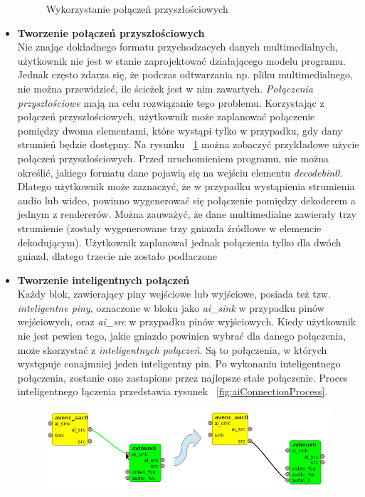 \documentclass[12pt]{article}
\begin{document}
\begin{itemize}
\begin{figure}[H]
  \caption{Wykorzystanie połączeń przyszłościowych}
  \label{fig:futureConnections}
\end{figure}
\item \textbf{Tworzenie połączeń przyszłościowych} \\
Nie znając dokładnego formatu przychodzacych danych multimedialnych, użytkownik nie jest w stanie zaprojektować działającego modelu programu. Jednak często zdarza się, że podczas odtwarzania np. pliku multimedialnego, nie można przewidzieć, ile ścieżek jest w nim zawartych. \textit{Połączenia przyszłościowe} mają na celu rozwiązanie tego problemu. Korzystając z połączeń przyszłościowych, użytkownik może zaplanować połączenie pomiędzy dwoma elementami, które wystąpi tylko w przypadku, gdy dany strumień będzie dostępny.
Na rysunku ~\ref{fig:futureConnections} można zobaczyć przykładowe użycie połączeń przyszłościowych. Przed uruchomieniem programu, nie można określić, jakiego formatu dane pojawią się na wejściu elementu \textit{decodebin0}. Dlatego użytkownik może zaznaczyć, że w przypadku wystąpienia strumienia audio lub wideo, powinno wygenerować się połączenie pomiędzy dekoderem a jednym z rendererów. Można zauważyć, że dane multimedialne zawierały trzy strumienie (zostały wygenerowane trzy gniazda źródłowe w elemencie dekodującym). Użytkownik zaplanował jednak połączenia tylko dla dwóch gniazd, dlatego trzecie nie zostało podłaczone\\
\item \textbf{Tworzenie inteligentnych połączeń} \\
Każdy blok, zawierający piny wejściowe lub wyjściowe, posiada też tzw. \textit{inteligentne piny}, oznaczone w bloku jako \textit{ai\_sink} w przypadku pinów wejściowych, oraz \textit{ai\_src} w przypadku pinów wyjściowych. Kiedy użytkownik nie jest pewien tego, jakie gniazdo powinien wybrać dla danego połączenia, może skorzystać z \textit{inteligentnych połączeń}. Są to połączenia, w których występuje conajmniej jeden inteligentny pin. Po wykonaniu inteligentnego połączenia, zostanie ono zastapione przez najlepsze stałe połączenie. Proces inteligentnego łączenia przedstawia rysunek ~\ref{fig:aiConnectionProcess}. 
\begin{figure}[H]
  \includegraphics[width=150mm]{img/ai-connection-process.png}

\end{figure}
\end{itemize}
\end{document}
